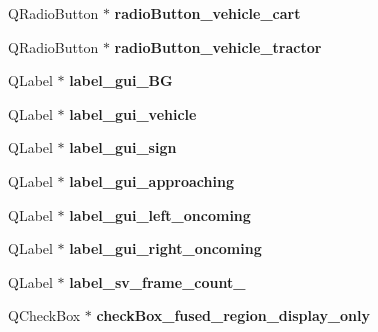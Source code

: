\begin{DoxyCompactItemize}
\item 
\hypertarget{class_ui___main_window_aef8665e39a13673201c86900cb630975}{}Q\+Radio\+Button $\ast$ {\bfseries radio\+Button\+\_\+vehicle\+\_\+cart}\label{class_ui___main_window_aef8665e39a13673201c86900cb630975}

\item 
\hypertarget{class_ui___main_window_acfd040d37bac1228078cd91fecf7b930}{}Q\+Radio\+Button $\ast$ {\bfseries radio\+Button\+\_\+vehicle\+\_\+tractor}\label{class_ui___main_window_acfd040d37bac1228078cd91fecf7b930}

\item 
\hypertarget{class_ui___main_window_a75a84e4b9296f604cd5ed0940286cb95}{}Q\+Label $\ast$ {\bfseries label\+\_\+gui\+\_\+\+B\+G}\label{class_ui___main_window_a75a84e4b9296f604cd5ed0940286cb95}

\item 
\hypertarget{class_ui___main_window_ab2ffde079981ca2a216424bad79d913f}{}Q\+Label $\ast$ {\bfseries label\+\_\+gui\+\_\+vehicle}\label{class_ui___main_window_ab2ffde079981ca2a216424bad79d913f}

\item 
\hypertarget{class_ui___main_window_a66f2a690513cfe3cb9ed682278ffcd60}{}Q\+Label $\ast$ {\bfseries label\+\_\+gui\+\_\+sign}\label{class_ui___main_window_a66f2a690513cfe3cb9ed682278ffcd60}

\item 
\hypertarget{class_ui___main_window_a2f61e5118e8b5d7070385316d466b73c}{}Q\+Label $\ast$ {\bfseries label\+\_\+gui\+\_\+approaching}\label{class_ui___main_window_a2f61e5118e8b5d7070385316d466b73c}

\item 
\hypertarget{class_ui___main_window_a775e4d4ca4bcbaa50bfd1ccdbbf34c23}{}Q\+Label $\ast$ {\bfseries label\+\_\+gui\+\_\+left\+\_\+oncoming}\label{class_ui___main_window_a775e4d4ca4bcbaa50bfd1ccdbbf34c23}

\item 
\hypertarget{class_ui___main_window_a17fc42cc0fb2adc1fa5e8cd867dde873}{}Q\+Label $\ast$ {\bfseries label\+\_\+gui\+\_\+right\+\_\+oncoming}\label{class_ui___main_window_a17fc42cc0fb2adc1fa5e8cd867dde873}

\item 
\hypertarget{class_ui___main_window_aad6abbb265ab3f9b51690819d32c1d09}{}Q\+Label $\ast$ {\bfseries label\+\_\+sv\+\_\+frame\+\_\+count\+\_}\label{class_ui___main_window_aad6abbb265ab3f9b51690819d32c1d09}

\item 
\hypertarget{class_ui___main_window_ad122c20205eccfa9483c1bbba70d2393}{}Q\+Check\+Box $\ast$ {\bfseries check\+Box\+\_\+fused\+\_\+region\+\_\+display\+\_\+only}\label{class_ui___main_window_ad122c20205eccfa9483c1bbba70d2393}


\end{DoxyCompactItemize}
